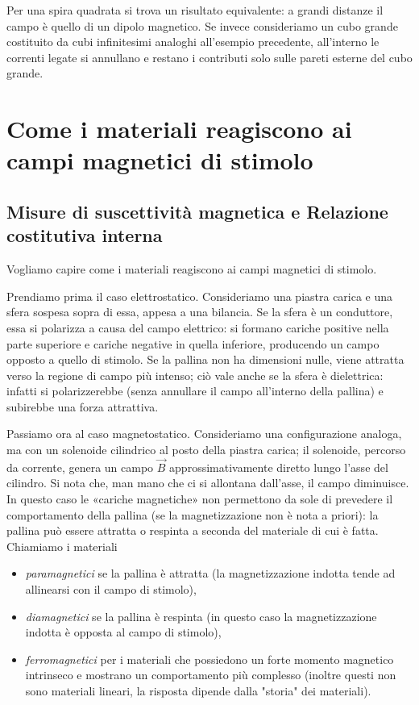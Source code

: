 \documentclass{book}
\begin{document}
Per una spira quadrata si trova un risultato equivalente: a grandi distanze il campo è quello di un dipolo magnetico. Se invece consideriamo un cubo grande costituito da cubi infinitesimi analoghi all'esempio precedente, all'interno le correnti legate si annullano e restano i contributi solo sulle pareti esterne del cubo grande.








\chapter{Come i materiali reagiscono ai campi magnetici di stimolo}


\section{Misure di suscettivit\`a magnetica e Relazione costitutiva interna}

Vogliamo capire come i materiali reagiscono ai campi magnetici di stimolo.

Prendiamo prima il caso elettrostatico.
Consideriamo una piastra carica e una sfera sospesa sopra di essa, appesa a una bilancia. Se la sfera è un conduttore, essa si polarizza a causa del campo elettrico: si formano cariche positive nella parte superiore e cariche negative in quella inferiore, producendo un campo opposto a quello di stimolo. Se la pallina non ha dimensioni nulle, viene attratta verso la regione di campo più intenso; ciò vale anche se la sfera è dielettrica: infatti si polarizzerebbe (senza annullare il campo all'interno della pallina) e subirebbe una forza attrattiva.

Passiamo ora al caso magnetostatico.
Consideriamo una configurazione analoga, ma con un solenoide cilindrico al posto della piastra carica; il solenoide, percorso da corrente, genera un campo \(\vec{B}\) approssimativamente diretto lungo l'asse del cilindro. Si nota che, man mano che ci si allontana dall'asse, il campo diminuisce. In questo caso le «cariche magnetiche» non permettono da sole di prevedere il comportamento della pallina (se la magnetizzazione non è nota a priori): la pallina può essere attratta o respinta a seconda del materiale di cui è fatta. Chiamiamo i materiali
\begin{itemize}
  \item \emph{paramagnetici} se la pallina è attratta (la magnetizzazione indotta tende ad allinearsi con il campo di stimolo),
  \item \emph{diamagnetici} se la pallina è respinta (in questo caso la magnetizzazione indotta è opposta al campo di stimolo),
  \item \emph{ferromagnetici} per i materiali che possiedono un forte momento magnetico intrinseco e mostrano un comportamento più complesso (inoltre questi non sono materiali lineari, la risposta dipende dalla "storia" dei materiali).
\end{itemize}
\end{document}
